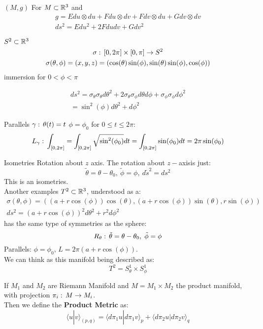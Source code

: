 $(M,g)$ For $M\subset \mathbb{R}^3$ and 
\begin{gather*}
g=Edu \otimes du + Fdu\otimes dv + Fdv \otimes du + Gdv\otimes dv\\
ds^2 = Edu^2 + 2Fdudv + Gdv^2
\end{gather*}

\begin{examples}\label{ejemplo:1}
$S^2\subset \mathbb{R}^3 $
\begin{gather*}
\sigma:\, [0,2\pi]\times [0,\pi] \to S^2\\
\sigma(\theta,\phi) = (x,y,z) = (\cos(\theta)\sin(\phi),\sin(\theta)\sin(\phi), \cos(\phi))
\end{gather*}
immersion for $0<\phi<\pi$
\end{examples}

\begin{gather*}
ds^2 = \sigma_\theta\sigma_\theta d\theta^2 + 2\sigma_\theta \sigma_\phi d\theta d\phi + \sigma_\phi \sigma_\phi d\phi^2\\
= \sin^2(\phi) d\theta^2 + d\phi^2
\end{gather*}

Parallels $\gamma:\, \theta(t) = t$ $\phi=\phi_0$ for $0\leq t \leq 2\pi$:
$$L_\gamma :\, \int_{[0,2\pi]} = \int_{[0,2\pi]}\sqrt{\sin^2(\phi_0)} dt = \int_{[0,2\pi]} \sin(\phi_0)dt = 2\pi\sin(\phi_0)$$

Isometries Rotation about $z$ axis. The rotation about $z-$axisis just:
$$\tilde \theta = \theta-\theta_0,\ \tilde \phi = \phi, \ d\tilde s^2= ds^2$$
This is an isometries.\\
Another examples $T^2\subset \mathbb{R}^3$, understood as a:
\begin{gather*}
\sigma(\theta, \phi) = ((a+r\cos(\phi))\cos(\theta), (a+r\cos(\phi))\sin(\theta), r\sin(\phi))\\
ds^2 = (a+r\cos(\phi))^2 d\theta^2 + r^2 d\phi^2
\end{gather*}
has the same type of symmetries as the sphere:
$$R_\theta:\, \tilde \theta=\theta-\theta_0,\; \tilde\phi=\phi$$
Parallels: $\phi=\phi_0$, $L=2\pi (a+r\cos(\phi))$.\\
We can think as this manifold being described as:
$$T^2=S_\theta^1 \times S_\phi^1$$

\begin{ddef}
If $M_1$ and $M_2$ are Riemann Manifold and $M=M_1\times M_2$ the product manifold, with projection $\pi_i :\, M\to M_i$.\\
Then we define the \textbf{Product Metric} as:
$$\langle u | v \rangle _{(p,q)} = \langle d\pi_1 u | d\pi_1 v\rangle_p + \langle d\pi_2 u | d\pi_2 v \rangle_q$$
\end{ddef}

